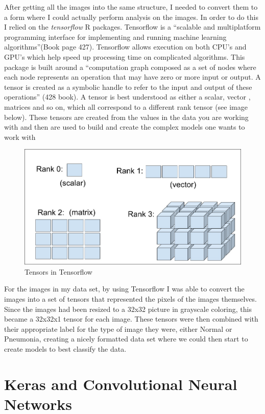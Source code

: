 \documentclass[12pt]{article}
\begin{document}
After getting all the images into the same structure, I needed to
convert them to a form where I could actually perform analysis on the
images. In order to do this I relied on the \emph{tensorflow} R
packages. Tensorflow is a ``scalable and multiplatform programming
interface for implementing and running machine learning
algorithms''(Book page 427). Tensorflow allows execution on both CPU's
and GPU's which help speed up processing time on complicated algorithms.
This package is built around a ``computation graph composed as a set of
nodes where each node represents an operation that may have zero or more
input or output. A tensor is created as a symbolic handle to refer to
the input and output of these operations'' (428 book). A tensor is best
understood as either a scalar, vector , matrices and so on, which all
correspond to a different rank tensor (see image below). These tensors
are created from the values in the data you are working with and then
are used to build and create the complex models one wants to work with

\begin{figure}

{\centering \includegraphics[width=0.75\linewidth,height=0.25\textheight]{images/tensors} 

}

\caption{Tensors in Tensorflow}\label{fig:sample-fig5}
\end{figure}

For the images in my data set, by using Tensorflow I was able to convert
the images into a set of tensors that represented the pixels of the
images themselves. Since the images had been resized to a 32x32 picture
in grayscale coloring, this became a 32x32x1 tensor for each image.
These tensors were then combined with their appropriate label for the
type of image they were, either Normal or Pneumonia, creating a nicely
formatted data set where we could then start to create models to best
classify the data.

\hypertarget{keras-and-convolutional-neural-networks}{%
\section{Keras and Convolutional Neural
Networks}\label{keras-and-convolutional-neural-networks}}
\end{document}
